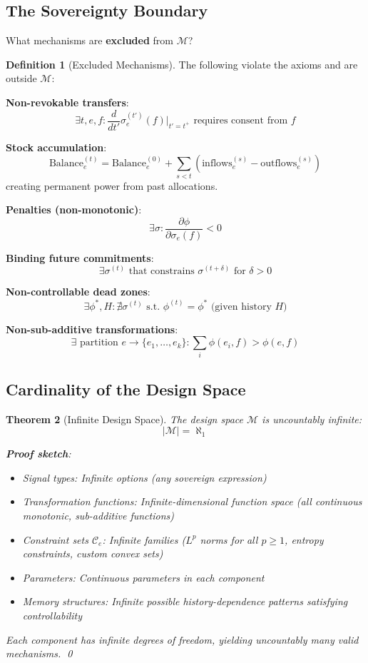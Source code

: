 \documentclass[11pt,a4paper]{article}
\newtheorem{theorem}{Theorem}[section]
\theoremstyle{definition}
\newtheorem{definition}[theorem]{Definition}
\theoremstyle{remark}
\newcommand{\C}{\mathcal{C}}
\begin{document}
\subsection{The Sovereignty Boundary}

What mechanisms are \textbf{excluded} from $\mathcal{M}$?

\begin{definition}[Excluded Mechanisms]
\label{def:excluded-mechanisms}
The following violate the axioms and are outside $\mathcal{M}$:

\textbf{Non-revokable transfers}:
\[ \exists t, e, f: \frac{d}{dt'}\sigma_e^{(t')}(f)\big|_{t'=t^+} \text{ requires consent from } f \]

\textbf{Stock accumulation}:
\[ \text{Balance}_e^{(t)} = \text{Balance}_e^{(0)} + \sum_{s<t} (\text{inflows}_e^{(s)} - \text{outflows}_e^{(s)}) \]
creating permanent power from past allocations.

\textbf{Penalties (non-monotonic)}:
\[ \exists \sigma: \frac{\partial \phi}{\partial \sigma_e(f)} < 0 \]

\textbf{Binding future commitments}:
\[ \exists \sigma^{(t)} \text{ that constrains } \sigma^{(t+\delta)} \text{ for } \delta > 0 \]

\textbf{Non-controllable dead zones}:
\[ \exists \phi^*, H: \nexists \sigma^{(t)} \text{ s.t. } \phi^{(t)} = \phi^* \text{ (given history } H) \]

\textbf{Non-sub-additive transformations}:
\[ \exists \text{ partition } e \to \{e_1,\ldots,e_k\}: \sum_i \phi(e_i, f) > \phi(e, f) \]
\end{definition}

\subsection{Cardinality of the Design Space}

\begin{theorem}[Infinite Design Space]
\label{thm:infinite-design-space}
The design space $\mathcal{M}$ is uncountably infinite:
\[ |\mathcal{M}| = \aleph_1 \]

\textbf{Proof sketch}:
\begin{itemize}
\item Signal types: Infinite options (any sovereign expression)
\item Transformation functions: Infinite-dimensional function space (all continuous monotonic, sub-additive functions)
\item Constraint sets $\C_e$: Infinite families ($L^p$ norms for all $p \ge 1$, entropy constraints, custom convex sets)
\item Parameters: Continuous parameters in each component
\item Memory structures: Infinite possible history-dependence patterns satisfying controllability
\end{itemize}

Each component has infinite degrees of freedom, yielding uncountably many valid mechanisms. \qed
\end{theorem}
\end{document}
